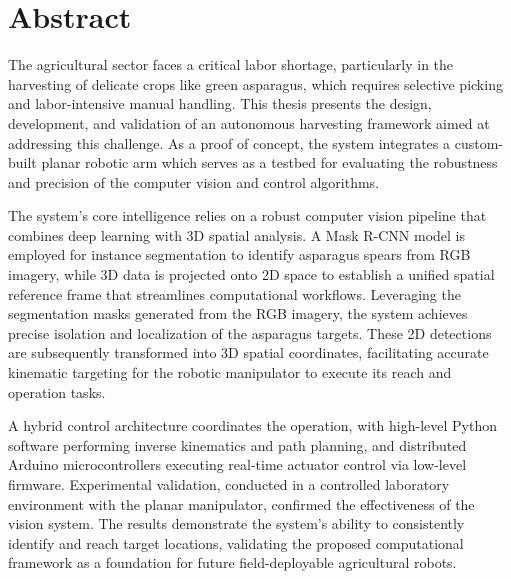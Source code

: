  \chapter*{\textbf{Abstract}}
The agricultural sector faces a critical labor shortage, particularly in the harvesting of delicate crops like green asparagus, which requires selective picking and labor-intensive manual handling. This thesis presents the design, development, and validation of an autonomous harvesting framework aimed at addressing this challenge. As a proof of concept, the system integrates a custom-built planar robotic arm which serves as a testbed for evaluating the robustness and precision of the computer vision and control algorithms.

The system's core intelligence relies on a robust computer vision pipeline that 
combines deep learning with 3D spatial analysis. A Mask R-CNN model is employed 
for instance segmentation to identify asparagus spears from RGB imagery, while 
3D data is projected onto 2D space to establish a unified spatial reference frame that streamlines computational workflows. Leveraging the segmentation 
masks generated from the RGB imagery, the system achieves precise isolation and localization of the asparagus 
targets. These 2D detections are subsequently transformed into 3D spatial coordinates, facilitating accurate 
kinematic targeting for the robotic manipulator to execute its reach and operation tasks.

A hybrid control architecture coordinates the operation, with high-level Python 
software performing inverse kinematics and path planning, and distributed 
Arduino microcontrollers executing real-time actuator control via low-level 
firmware. Experimental validation, conducted in a controlled laboratory 
environment with the planar manipulator, confirmed the effectiveness of the 
vision system. The results demonstrate the system's ability to consistently 
identify and reach target locations, validating the proposed computational 
framework as a foundation for future field-deployable agricultural robots.

